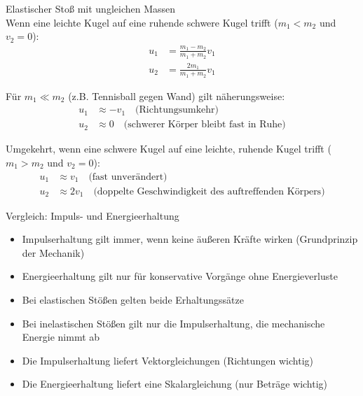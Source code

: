 \begin{example2}{Elastischer Stoß mit ungleichen Massen}\\
    Wenn eine leichte Kugel auf eine ruhende schwere Kugel trifft ($m_1 < m_2$ und $v_2 = 0$):
    \begin{align}
        u_1 &= \frac{m_1 - m_2}{m_1 + m_2}v_1 \\
        u_2 &= \frac{2m_1}{m_1 + m_2}v_1
    \end{align}
    
    Für $m_1 \ll m_2$ (z.B. Tennisball gegen Wand) gilt näherungsweise:
    \begin{align}
        u_1 &\approx -v_1 \quad \text{(Richtungsumkehr)} \\
        u_2 &\approx 0 \quad \text{(schwerer Körper bleibt fast in Ruhe)}
    \end{align}
    
    Umgekehrt, wenn eine schwere Kugel auf eine leichte, ruhende Kugel trifft ($m_1 > m_2$ und $v_2 = 0$):
    \begin{align}
        u_1 &\approx v_1 \quad \text{(fast unverändert)} \\
        u_2 &\approx 2v_1 \quad \text{(doppelte Geschwindigkeit des auftreffenden Körpers)}
    \end{align}
\end{example2}

\begin{concept}{Vergleich: Impuls- und Energieerhaltung}\\
    \begin{itemize}
        \item Impulserhaltung gilt immer, wenn keine äußeren Kräfte wirken (Grundprinzip der Mechanik)
        \item Energieerhaltung gilt nur für konservative Vorgänge ohne Energieverluste
        \item Bei elastischen Stößen gelten beide Erhaltungssätze
        \item Bei inelastischen Stößen gilt nur die Impulserhaltung, die mechanische Energie nimmt ab
        \item Die Impulserhaltung liefert Vektorgleichungen (Richtungen wichtig)
        \item Die Energieerhaltung liefert eine Skalargleichung (nur Beträge wichtig)
    \end{itemize}
\end{concept}

